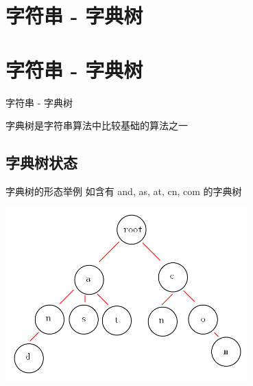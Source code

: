
\def\sectionName{字符串 - 字典树}



\isBeamerMode\relax
    \section[\TOCName]{\sectionName}
\fi
\isBeamerMode\relax
    \section[\TOCName\ -\ \sectionName]{\sectionName}
\fi

\begin{frame}

\isBeamerMode\relax
    {\Huge \sectionName}\par
\fi




字典树是字符串算法中比较基础的算法之一



\end{frame}

\subsection{字典树状态}
\begin{frame}{字典树的形态举例} %
如含有 and, as, at, cn, com 的字典树
\begin{center}
\includegraphics[width=0.7\textwidth]{./pic/trie_state.png}
\end{center}
\end{frame}


